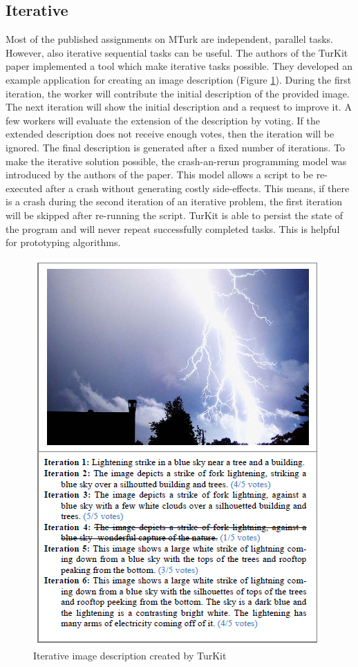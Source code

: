 \subsection{Iterative}
\label{iterative}
Most of the published assignments on MTurk are independent, parallel tasks. However, also iterative sequential tasks can be useful. The authors of the TurKit paper \cite{turkit} implemented a tool which make iterative tasks possible. They developed an example application for creating an image description (Figure \ref{turkit}). During the first iteration, the worker will contribute the initial description of the provided image. The next iteration will show the initial description and a request to improve it. A few workers will evaluate the extension of the description by voting. If the extended description does not receive enough votes, then the iteration will be ignored. The final description is generated after a fixed number of iterations. To make the iterative solution possible, the crash-an-rerun programming model was introduced by the authors of the paper. This model allows a script to be re-executed after a crash without generating costly side-effects. This means, if there is a crash during the second iteration of an iterative problem, the first iteration will be skipped after re-running the script. TurKit is able to persist the state of the program and will never repeat successfully completed tasks. This is helpful for prototyping algorithms.
\begin{figure}
\centering
\includegraphics[scale=0.65]{images/turkit_description_example.png}
\caption{Iterative image description created by TurKit}
\label{turkit}
\end{figure}

